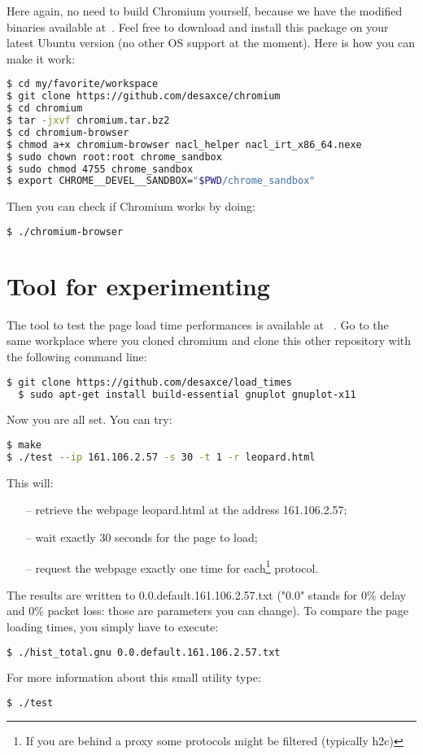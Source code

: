 \documentclass[12pt, notitlepage]{article}
\begin{document}
\newpage
Here again, no need to build Chromium yourself, because we have the
modified binaries available at~\cite{chromium}. Feel free to download and
install this package on your latest Ubuntu version (no other OS support at 
the moment). Here is how you can make it work:
\begin{lstlisting}[language=bash]
$ cd my/favorite/workspace 
$ git clone https://github.com/desaxce/chromium 
$ cd chromium 
$ tar -jxvf chromium.tar.bz2 
$ cd chromium-browser 
$ chmod a+x chromium-browser nacl_helper nacl_irt_x86_64.nexe 
$ sudo chown root:root chrome_sandbox 
$ sudo chmod 4755 chrome_sandbox 
$ export CHROME__DEVEL__SANDBOX="$PWD/chrome_sandbox"
\end{lstlisting}

Then you can check if Chromium works by doing: 
\begin{lstlisting}[language=bash]
$ ./chromium-browser
\end{lstlisting}

\section{Tool for experimenting}
The tool to test the page load time performances is available at
~\cite{load_times}. Go to the same workplace where you cloned chromium
and clone this other repository with the following command line: 
\begin{lstlisting}[language=bash]
  $ git clone https://github.com/desaxce/load_times
  $ sudo apt-get install build-essential gnuplot gnuplot-x11
\end{lstlisting}
\vspace*{0.5cm}

Now you are all set. You can try: 
\begin{lstlisting}[language=bash]
$ make
$ ./test --ip 161.106.2.57 -s 30 -t 1 -r leopard.html
\end{lstlisting}

\vspace*{0.5cm}
This will: 
\begin{itemize}[noitemsep]
\item[--] retrieve the webpage leopard.html at the address 
161.106.2.57;
\item[--] wait exactly 30 seconds for the page to load;
\item[--] request the webpage exactly one time for each\footnote{If you are
behind a proxy some protocols might be filtered (typically h2c)}
protocol.
\end{itemize}

The results are written to 0.0.default.161.106.2.57.txt ("0.0" stands for
0\% delay and 0\% packet loss: those are parameters you can change). To
compare the page loading times, you simply have to execute:
\begin{lstlisting}[language=bash]
$ ./hist_total.gnu 0.0.default.161.106.2.57.txt
\end{lstlisting}
For more information about this small utility type:
\begin{lstlisting}[language=bash]
$ ./test
\end{lstlisting}
\newpage

\end{document}

